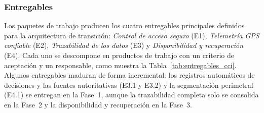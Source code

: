 \subsubsection{Entregables}

Los paquetes de trabajo producen los cuatro entregables principales definidos para la arquitectura de transición: \textit{Control de
    acceso seguro} (E1), \textit{Telemetría GPS confiable} (E2), \textit{Trazabilidad de los datos} (E3) y \textit{Disponibilidad y
    recuperación} (E4). Cada uno se descompone en productos de trabajo con un criterio de aceptación y un responsable, como muestra la
Tabla~\ref{tab:entregables_cci}. Algunos entregables maduran de forma incremental: los registros automáticos de decisiones y las
fuentes autoritativas (E3.1 y E3.2) y la segmentación perimetral (E4.1) se entregan en la Fase~1, aunque la trazabilidad completa
solo se consolida en la Fase~2 y la disponibilidad y recuperación en la Fase~3.

